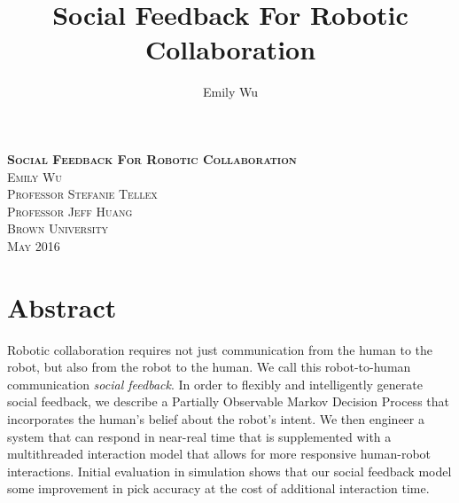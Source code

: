 \documentclass{article}
\title{Social Feedback For Robotic Collaboration}
\author{Emily Wu}
\begin{document}

\vspace*{8cm}

\begin{raggedleft}
	\scshape
	\huge \textbf{Social Feedback For Robotic Collaboration} \\
	\vspace{0.3cm}
	\Large 
	Emily Wu  \\
	Professor Stefanie Tellex \\
	Professor Jeff Huang \\
	Brown University \\
	May 2016 \\
\end{raggedleft}

\newpage



\vspace*{\fill}
\section*{Abstract}
Robotic collaboration requires not just communication from the human to the robot, but also from the robot to the human. We call this robot-to-human communication \emph{social feedback}. In order to flexibly and intelligently generate social feedback, we describe a Partially Observable Markov Decision Process that incorporates the human's belief about the robot's intent. We then engineer a system that can respond in near-real time that is supplemented with a multithreaded interaction model that allows for more responsive human-robot interactions. Initial evaluation in simulation shows that our social feedback model some improvement in pick accuracy at the cost of additional interaction time.
\vspace*{\fill}
\newpage
\tableofcontents
\newpage
{} 
\end{document}
